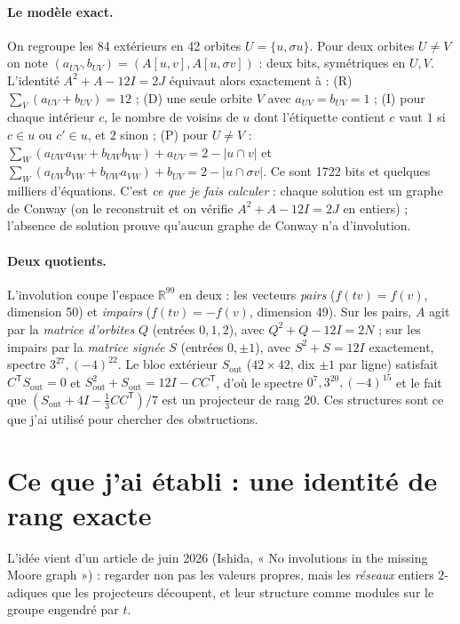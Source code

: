 \documentclass[11pt,a4paper]{article}
\theoremstyle{definition}
\theoremstyle{remark}
\begin{document}
\paragraph{Le modèle exact.} On regroupe les 84 extérieurs en 42 orbites $U=\{u,\sigma u\}$. Pour deux orbites $U\neq V$ on note
$(a_{UV},b_{UV})=(A[u,v],A[u,\sigma v])$ : deux bits, symétriques en $U,V$. L'identité $A^2+A-12I=2J$ équivaut alors exactement à :
(R) $\sum_V(a_{UV}+b_{UV})=12$ ; (D) une seule orbite $V$ avec $a_{UV}=b_{UV}=1$ ; (I) pour chaque intérieur $c$, le nombre de voisins de $u$ dont
l'étiquette contient $c$ vaut $1$ si $c\in u$ ou $c'\in u$, et $2$ sinon ; (P) pour $U\neq V$ :
$\sum_W(a_{UW}a_{VW}+b_{UW}b_{VW})+a_{UV}=2-|u\cap v|$ et $\sum_W(a_{UW}b_{VW}+b_{UW}a_{VW})+b_{UV}=2-|u\cap\sigma v|$.
Ce sont 1722 bits et quelques milliers d'équations. C'est \emph{ce que je fais calculer} : chaque solution est un graphe de Conway (on le reconstruit et on
vérifie $A^2+A-12I=2J$ en entiers) ; l'absence de solution prouve qu'aucun graphe de Conway n'a d'involution.

\paragraph{Deux quotients.} L'involution coupe l'espace $\mathbb{R}^{99}$ en deux : les vecteurs \emph{pairs} ($f(tv)=f(v)$, dimension 50) et \emph{impairs}
($f(tv)=-f(v)$, dimension 49). Sur les pairs, $A$ agit par la \emph{matrice d'orbites} $Q$ (entrées $0,1,2$), avec $Q^2+Q-12I=2N$ ; sur les impairs par la
\emph{matrice signée} $S$ (entrées $0,\pm1$), avec $S^2+S=12I$ exactement, spectre $3^{27},(-4)^{22}$. Le bloc extérieur $S_{\mathrm{out}}$ ($42\times42$, dix
$\pm1$ par ligne) satisfait $C^{\mathsf T}S_{\mathrm{out}}=0$ et $S_{\mathrm{out}}^2+S_{\mathrm{out}}=12I-CC^{\mathsf T}$, d'où le spectre $0^7,3^{20},(-4)^{15}$
et le fait que $(S_{\mathrm{out}}+4I-\tfrac13CC^{\mathsf T})/7$ est un projecteur de rang 20. Ces structures sont ce que j'ai utilisé pour chercher des obstructions.

\section{Ce que j'ai établi : une identité de rang exacte}
L'idée vient d'un article de juin 2026 (Ishida, « No involutions in the missing Moore graph ») : regarder non pas les valeurs propres, mais les
\emph{réseaux} entiers $2$-adiques que les projecteurs découpent, et leur structure comme modules sur le groupe engendré par $t$.
\end{document}
